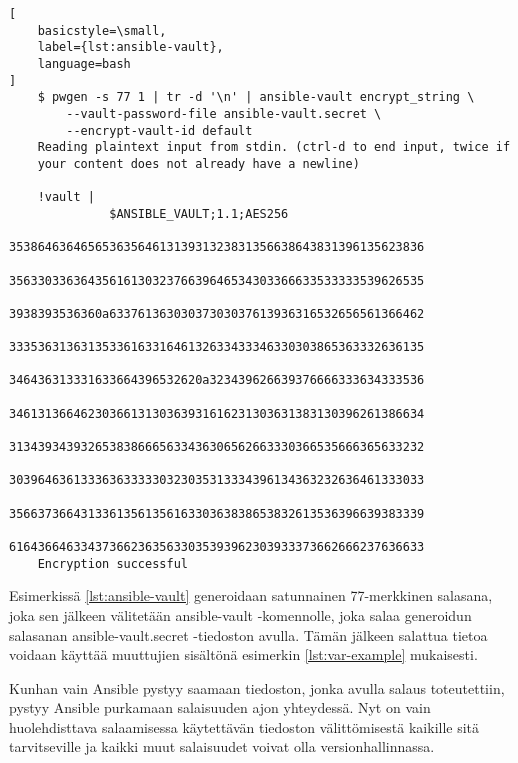 \begin{lstlisting}[
    basicstyle=\small,
    label={lst:ansible-vault},
    language=bash
]
    $ pwgen -s 77 1 | tr -d '\n' | ansible-vault encrypt_string \
        --vault-password-file ansible-vault.secret \
        --encrypt-vault-id default
    Reading plaintext input from stdin. (ctrl-d to end input, twice if
    your content does not already have a newline)

    !vault |
              $ANSIBLE_VAULT;1.1;AES256
              3538646364656536356461313931323831356638643831396135623836
              3563303363643561613032376639646534303366633533333539626535
              3938393536360a63376136303037303037613936316532656561366462
              3335363136313533616331646132633433346330303865363332636135
              346436313331633664396532620a323439626639376666333634333536
              3461313664623036613130363931616231303631383130396261386634
              3134393439326538386665633436306562663330366535666365633232
              3039646361333636333330323035313334396134363232636461333033
              3566373664313361356135616330363838653832613536396639383339
              6164366463343736623635633035393962303933373662666237636633
    Encryption successful

\end{lstlisting}

Esimerkissä \ref{lst:ansible-vault} generoidaan satunnainen 77-merkkinen salasana,
joka sen jälkeen välitetään ansible-vault -komennolle, joka salaa generoidun
salasanan ansible-vault.secret -tiedoston avulla. Tämän jälkeen salattua tietoa
voidaan käyttää muuttujien sisältönä esimerkin \ref{lst:var-example} mukaisesti.



Kunhan vain Ansible pystyy saamaan tiedoston, jonka avulla salaus toteutettiin,
pystyy Ansible purkamaan salaisuuden ajon yhteydessä. Nyt on vain huolehdisttava
salaamisessa käytettävän tiedoston välittömisestä kaikille sitä tarvitseville ja
kaikki muut salaisuudet voivat olla versionhallinnassa.
